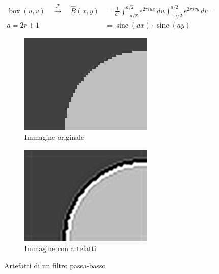 \documentclass[../main.tex]{subfiles}
\begin{document}
	\begin{equation}
		\begin{aligned}
			\operatorname{box}(u,v) \quad\overset{\mathcal{F}}{\longrightarrow}\quad \hat{B}(x,y) &=  \frac{1}{a^2}\int_{-a/2}^{a/2}e^{2\pi iux}\,du\int_{-a/2}^{a/2}e^{2\pi ivy}\,dv =\\
			\boxed{a = 2r + 1} \qquad\quad &= \operatorname{sinc}(ax)\cdot\operatorname{sinc}(ay)
		\end{aligned}
	\end{equation}
	
	\begin{figure}[ht]
		\centering
		\begin{subfigure}{0.4\linewidth}
			\centering
			\includegraphics[keepaspectratio, width=\linewidth]{images/ringing_orignal.png}
			\caption{Immagine originale}
		\end{subfigure}
		\hspace{20pt}
		\begin{subfigure}{0.4\linewidth}
			\centering
			\includegraphics[keepaspectratio, width=\linewidth]{images/ringing_artifact.png}
			\caption{Immagine con artefatti}
		\end{subfigure}
		\caption[Artefatti di un filtro passa-basso ideale]{
			Artefatti di un filtro passa-basso \cite{ringingImage}}
	\end{figure}
	
\end{document}
